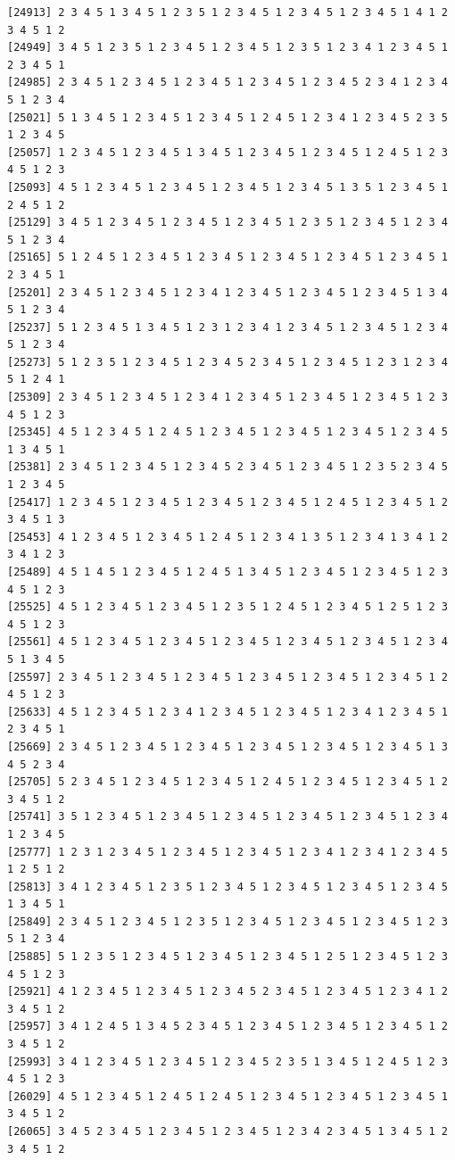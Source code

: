 \documentclass[
  11pt,
]{book}
\begin{document}
\begin{verbatim}
[24913] 2 3 4 5 1 3 4 5 1 2 3 5 1 2 3 4 5 1 2 3 4 5 1 2 3 4 5 1 4 1 2 3 4 5 1 2
[24949] 3 4 5 1 2 3 5 1 2 3 4 5 1 2 3 4 5 1 2 3 5 1 2 3 4 1 2 3 4 5 1 2 3 4 5 1
[24985] 2 3 4 5 1 2 3 4 5 1 2 3 4 5 1 2 3 4 5 1 2 3 4 5 2 3 4 1 2 3 4 5 1 2 3 4
[25021] 5 1 3 4 5 1 2 3 4 5 1 2 3 4 5 1 2 4 5 1 2 3 4 1 2 3 4 5 2 3 5 1 2 3 4 5
[25057] 1 2 3 4 5 1 2 3 4 5 1 3 4 5 1 2 3 4 5 1 2 3 4 5 1 2 4 5 1 2 3 4 5 1 2 3
[25093] 4 5 1 2 3 4 5 1 2 3 4 5 1 2 3 4 5 1 2 3 4 5 1 3 5 1 2 3 4 5 1 2 4 5 1 2
[25129] 3 4 5 1 2 3 4 5 1 2 3 4 5 1 2 3 4 5 1 2 3 5 1 2 3 4 5 1 2 3 4 5 1 2 3 4
[25165] 5 1 2 4 5 1 2 3 4 5 1 2 3 4 5 1 2 3 4 5 1 2 3 4 5 1 2 3 4 5 1 2 3 4 5 1
[25201] 2 3 4 5 1 2 3 4 5 1 2 3 4 1 2 3 4 5 1 2 3 4 5 1 2 3 4 5 1 3 4 5 1 2 3 4
[25237] 5 1 2 3 4 5 1 3 4 5 1 2 3 1 2 3 4 1 2 3 4 5 1 2 3 4 5 1 2 3 4 5 1 2 3 4
[25273] 5 1 2 3 5 1 2 3 4 5 1 2 3 4 5 2 3 4 5 1 2 3 4 5 1 2 3 1 2 3 4 5 1 2 4 1
[25309] 2 3 4 5 1 2 3 4 5 1 2 3 4 1 2 3 4 5 1 2 3 4 5 1 2 3 4 5 1 2 3 4 5 1 2 3
[25345] 4 5 1 2 3 4 5 1 2 4 5 1 2 3 4 5 1 2 3 4 5 1 2 3 4 5 1 2 3 4 5 1 3 4 5 1
[25381] 2 3 4 5 1 2 3 4 5 1 2 3 4 5 2 3 4 5 1 2 3 4 5 1 2 3 5 2 3 4 5 1 2 3 4 5
[25417] 1 2 3 4 5 1 2 3 4 5 1 2 3 4 5 1 2 3 4 5 1 2 4 5 1 2 3 4 5 1 2 3 4 5 1 3
[25453] 4 1 2 3 4 5 1 2 3 4 5 1 2 4 5 1 2 3 4 1 3 5 1 2 3 4 1 3 4 1 2 3 4 1 2 3
[25489] 4 5 1 4 5 1 2 3 4 5 1 2 4 5 1 3 4 5 1 2 3 4 5 1 2 3 4 5 1 2 3 4 5 1 2 3
[25525] 4 5 1 2 3 4 5 1 2 3 4 5 1 2 3 5 1 2 4 5 1 2 3 4 5 1 2 5 1 2 3 4 5 1 2 3
[25561] 4 5 1 2 3 4 5 1 2 3 4 5 1 2 3 4 5 1 2 3 4 5 1 2 3 4 5 1 2 3 4 5 1 3 4 5
[25597] 2 3 4 5 1 2 3 4 5 1 2 3 4 5 1 2 3 4 5 1 2 3 4 5 1 2 3 4 5 1 2 4 5 1 2 3
[25633] 4 5 1 2 3 4 5 1 2 3 4 1 2 3 4 5 1 2 3 4 5 1 2 3 4 1 2 3 4 5 1 2 3 4 5 1
[25669] 2 3 4 5 1 2 3 4 5 1 2 3 4 5 1 2 3 4 5 1 2 3 4 5 1 2 3 4 5 1 3 4 5 2 3 4
[25705] 5 2 3 4 5 1 2 3 4 5 1 2 3 4 5 1 2 4 5 1 2 3 4 5 1 2 3 4 5 1 2 3 4 5 1 2
[25741] 3 5 1 2 3 4 5 1 2 3 4 5 1 2 3 4 5 1 2 3 4 5 1 2 3 4 5 1 2 3 4 1 2 3 4 5
[25777] 1 2 3 1 2 3 4 5 1 2 3 4 5 1 2 3 4 5 1 2 3 4 1 2 3 4 1 2 3 4 5 1 2 5 1 2
[25813] 3 4 1 2 3 4 5 1 2 3 5 1 2 3 4 5 1 2 3 4 5 1 2 3 4 5 1 2 3 4 5 1 3 4 5 1
[25849] 2 3 4 5 1 2 3 4 5 1 2 3 5 1 2 3 4 5 1 2 3 4 5 1 2 3 4 5 1 2 3 5 1 2 3 4
[25885] 5 1 2 3 5 1 2 3 4 5 1 2 3 4 5 1 2 3 4 5 1 2 5 1 2 3 4 5 1 2 3 4 5 1 2 3
[25921] 4 1 2 3 4 5 1 2 3 4 5 1 2 3 4 5 2 3 4 5 1 2 3 4 5 1 2 3 4 1 2 3 4 5 1 2
[25957] 3 4 1 2 4 5 1 3 4 5 2 3 4 5 1 2 3 4 5 1 2 3 4 5 1 2 3 4 5 1 2 3 4 5 1 2
[25993] 3 4 1 2 3 4 5 1 2 3 4 5 1 2 3 4 5 2 3 5 1 3 4 5 1 2 4 5 1 2 3 4 5 1 2 3
[26029] 4 5 1 2 3 4 5 1 2 4 5 1 2 4 5 1 2 3 4 5 1 2 3 4 5 1 2 3 4 5 1 3 4 5 1 2
[26065] 3 4 5 2 3 4 5 1 2 3 4 5 1 2 3 4 5 1 2 3 4 2 3 4 5 1 3 4 5 1 2 3 4 5 1 2

\end{verbatim}
\end{document}
